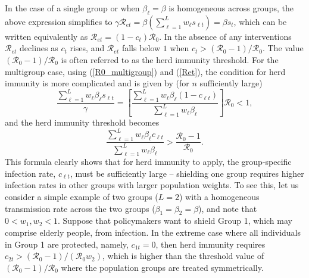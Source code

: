 \documentclass[12pt]{article}
\begin{document}
In the case of a single group or when $\beta_{\ell}=\beta$ is homogeneous
across groups, the above expression simplifies to $\gamma\mathcal{R}%
_{et}=\beta\left(  \sum_{\ell=1}^{L}w_{\ell}s_{\ell t}\right)  =\beta s_{t}$,
which can be written equivalently as $\mathcal{R}_{et}=(1-c_{t})\mathcal{R}%
_{0}$. In the absence of any interventions $\mathcal{R}_{et}$ declines as
$c_{t}$ rises, and $\mathcal{R}_{et}$ falls below $1$ when $c_{t}%
>(\mathcal{R}_{0}-1)/\mathcal{R}_{0}$. The value $(\mathcal{R}_{0}%
-1)/\mathcal{R}_{0}$ is often referred to as the herd immunity threshold. For
the multigroup case, using (\ref{R0_multigroup}) and (\ref{Ret}), the
condition for herd immunity is more complicated and is given by (for $n$
sufficiently large)
\[
\frac{\sum_{\ell=1}^{L}w_{\ell}\beta_{\ell}s_{\ell t}}{\gamma}=\left[
\frac{\sum_{\ell=1}^{L}w_{\ell}\beta_{\ell}\left(  1-c_{\ell t}\right)  }%
{\sum_{\ell=1}^{L}w_{\ell}\beta_{\ell}}\right]  \mathcal{R}_{0}<1,
\]
and the herd immunity threshold becomes%
\[
\frac{\sum_{\ell=1}^{L}w_{\ell}\beta_{\ell}c_{\ell t}}{\sum_{\ell=1}%
^{L}w_{\ell}\beta_{\ell}}>\frac{\mathcal{R}_{0}-1}{\mathcal{R}_{0}}.
\]
This formula clearly shows that for herd immunity to apply, the group-specific
infection rate, $c_{\ell t}$, must be sufficiently large -- shielding one
group requires higher infection rates in other groups with larger population
weights. To see this, let us consider a simple example of two groups ($L=2$)
with a homogeneous transmission rate across the two groups ($\beta_{1}%
=\beta_{2}=\beta$), and note that $0<w_{1},w_{2}<1$. Suppose that policymakers
want to shield Group 1, which may comprise elderly people, from infection. In
the extreme case where all individuals in Group 1 are protected, namely,
$c_{1t}=0$, then herd immunity requires $c_{2t}>(\mathcal{R}_{0}-1)/\left(
\mathcal{R}_{0}w_{2}\right)  $, which is higher than the threshold value of
$(\mathcal{R}_{0}-1)/\mathcal{R}_{0}$ where the population groups are treated symmetrically.
\end{document}

